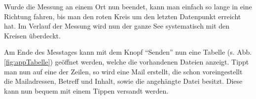 \documentclass[12pt,a4paper,titlepage,headinclude,bibtotoc]{scrartcl}
\begin{document}
Wurde die Messung an einem Ort nun beendet, kann man einfach so lange in eine Richtung fahren, bis man den roten Kreis um den letzten Datenpunkt erreicht hat.
Im Verlauf der Messung wird nun der ganze See systematisch mit den Kreisen überdeckt.

Am Ende des Messtages kann mit dem Knopf "`Senden"' nun eine Tabelle (s. Abb. \ref{fig:appTabelle}) geöffnet werden, welche die vorhandenen Dateien anzeigt.
Tippt man nun auf eine der Zeilen, so wird eine Mail erstellt, die schon voreingestellt die Mailadressen, Betreff und Inhalt, sowie die angehängte Datei besitzt.
Diese kann nun bequem mit einem Tippen versandt werden.


\begin{figure}[h]
  \centering
  \hfill
  \hfill

\end{figure}
\end{document}
